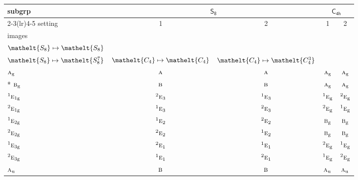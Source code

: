 \documentclass[10pt,a4paper]{article}
\numberwithin{equation}{section}
\newcommand{\eltfont}[1]{{\let\sigma\eltsigma\mathelt{#1}}}
\newcommand{\grp}[1]{\mathsf{#1}}
\newcommand{\irr}[1]{\text{\normalfont\scshape #1}}
\newcommand{\conjpair}[1]{{}^{#1}}
\newcommand{\cls}[1]{\eltfont{#1}}
\newcommand{\ptag}[1]{\mathrm{#1}}
\begin{document}
{\small\begin{longtable}{@{}lcccc@{}}\toprule
subgrp & \multicolumn{2}{c}{\href{S8.pdf}{$\grp{S_{8}}$}} & \multicolumn{2}{c}{\href{C4h.pdf}{$\grp{C_{4h}}$}}\\\cmidrule(lr){2-3}\cmidrule(lr){4-5}
setting & 1 & 2 & 1 & 2\\
images & {\scriptsize\begin{tabular}[t]{@{}c@{}}$\cls{C_{4}} \mapsto \cls{C_{4}}$\\$\cls{S_{8}} \mapsto \cls{S_{8}}$\end{tabular}} & {\scriptsize\begin{tabular}[t]{@{}c@{}}$\cls{C_{4}} \mapsto \cls{C_{4}^{3}}$\\$\cls{S_{8}} \mapsto \cls{S_{8}^{7}}$\end{tabular}} & {\scriptsize $\cls{C_{4}} \mapsto \cls{C_{4}}$} & {\scriptsize $\cls{C_{4}} \mapsto \cls{C_{4}^{3}}$}\\\midrule\endhead
\bottomrule\endfoot\endlastfoot
$\irr{a}_{\ptag{g}}$ & $\irr{a}$ & $\irr{a}$ & $\irr{a}_{\ptag{g}}$ & $\irr{a}_{\ptag{g}}$\\*
$\irr{b}_{\ptag{g}}$ & $\irr{b}$ & $\irr{b}$ & $\irr{a}_{\ptag{g}}$ & $\irr{a}_{\ptag{g}}$\\
$\conjpair{1}\irr{e}_{1\ptag{g}}$ & $\conjpair{2}\irr{e}_{3}$ & $\conjpair{1}\irr{e}_{3}$ & $\conjpair{1}\irr{e}_{\ptag{g}}$ & $\conjpair{2}\irr{e}_{\ptag{g}}$\\
$\conjpair{2}\irr{e}_{1\ptag{g}}$ & $\conjpair{1}\irr{e}_{3}$ & $\conjpair{2}\irr{e}_{3}$ & $\conjpair{2}\irr{e}_{\ptag{g}}$ & $\conjpair{1}\irr{e}_{\ptag{g}}$\\
$\conjpair{1}\irr{e}_{2\ptag{g}}$ & $\conjpair{1}\irr{e}_{2}$ & $\conjpair{2}\irr{e}_{2}$ & $\irr{b}_{\ptag{g}}$ & $\irr{b}_{\ptag{g}}$\\
$\conjpair{2}\irr{e}_{2\ptag{g}}$ & $\conjpair{2}\irr{e}_{2}$ & $\conjpair{1}\irr{e}_{2}$ & $\irr{b}_{\ptag{g}}$ & $\irr{b}_{\ptag{g}}$\\
$\conjpair{1}\irr{e}_{3\ptag{g}}$ & $\conjpair{2}\irr{e}_{1}$ & $\conjpair{1}\irr{e}_{1}$ & $\conjpair{2}\irr{e}_{\ptag{g}}$ & $\conjpair{1}\irr{e}_{\ptag{g}}$\\
$\conjpair{2}\irr{e}_{3\ptag{g}}$ & $\conjpair{1}\irr{e}_{1}$ & $\conjpair{2}\irr{e}_{1}$ & $\conjpair{1}\irr{e}_{\ptag{g}}$ & $\conjpair{2}\irr{e}_{\ptag{g}}$\\
$\irr{a}_{\ptag{u}}$ & $\irr{b}$ & $\irr{b}$ & $\irr{a}_{\ptag{u}}$ & $\irr{a}_{\ptag{u}}$\\

\end{longtable}}
\end{document}
